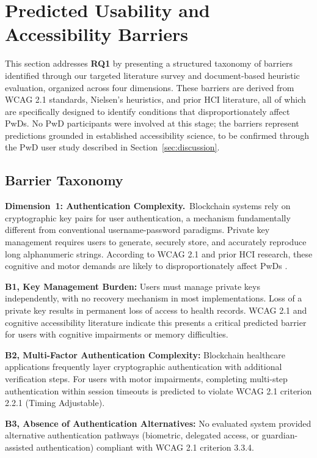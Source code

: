 \documentclass[journal,onecolumn]{IEEEtran}
\begin{document}
\section{Predicted Usability and Accessibility Barriers}
\label{sec:barriers}

This section addresses \textbf{RQ1} by presenting a structured taxonomy of barriers identified through our targeted literature survey and document-based heuristic evaluation, organized across four dimensions. These barriers are derived from WCAG 2.1 standards, Nielsen's heuristics, and prior HCI literature, all of which are specifically designed to identify conditions that disproportionately affect PwDs. No PwD participants were involved at this stage; the barriers represent predictions grounded in established accessibility science, to be confirmed through the PwD user study described in Section~\ref{sec:discussion}.

\subsection{Barrier Taxonomy}

\noindent\textbf{Dimension~1: Authentication Complexity.}\ Blockchain systems rely on cryptographic key pairs for user authentication, a mechanism fundamentally different from conventional username-password paradigms. Private key management requires users to generate, securely store, and accurately reproduce long alphanumeric strings. According to WCAG 2.1 and prior HCI research, these cognitive and motor demands are likely to disproportionately affect PwDs \cite{jang2020user}.

\textbf{B1, Key Management Burden:} Users must manage private keys independently, with no recovery mechanism in most implementations. Loss of a private key results in permanent loss of access to health records. WCAG 2.1 and cognitive accessibility literature indicate this presents a critical predicted barrier for users with cognitive impairments or memory difficulties.

\textbf{B2, Multi-Factor Authentication Complexity:} Blockchain healthcare applications frequently layer cryptographic authentication with additional verification steps. For users with motor impairments, completing multi-step authentication within session timeouts is predicted to violate WCAG 2.1 criterion 2.2.1 (Timing Adjustable).

\textbf{B3, Absence of Authentication Alternatives:} No evaluated system provided alternative authentication pathways (biometric, delegated access, or guardian-assisted authentication) compliant with WCAG 2.1 criterion 3.3.4.
\end{document}
